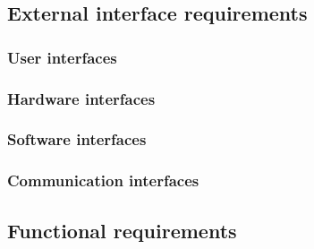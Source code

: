 \documentclass[12pt]{article}
\begin{document}
  \subsection{External interface requirements}
    \subsubsection{User interfaces}
    \label{sec:userinterfaces}
    \subsubsection{Hardware interfaces}
    \subsubsection{Software interfaces}
    \subsubsection{Communication interfaces}
  \subsection{Functional requirements}
\end{document}
